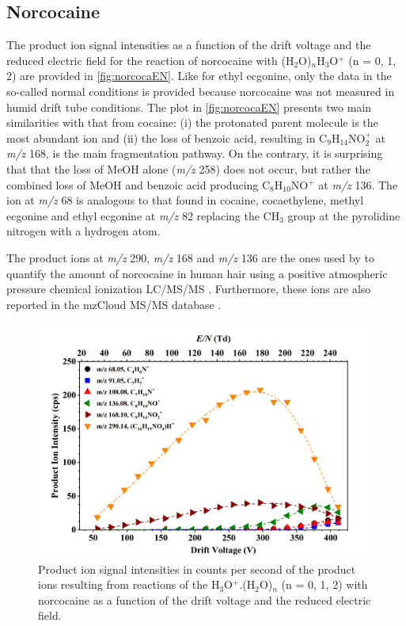 \subsection{Norcocaine}
The product ion signal intensities as a function of the drift voltage and the reduced electric field for the reaction of norcocaine with (H$_2$O)$_n$H$_3$O$^+$ (n = 0, 1, 2) are provided in \autoref{fig:norcocaEN}.
%
Like for ethyl ecgonine, only the data in the so-called normal conditions is provided because norcocaine was not measured in humid drift tube conditions. 
%
%
%
The plot in \autoref{fig:norcocaEN} presents two main similarities with that from cocaine:
(i) the protonated parent molecule is the most abundant ion and
(ii) the loss of benzoic acid, resulting in C$_{9}$H$_{14}$NO$_2^+$ at \textit{m/z} 168, is the main fragmentation pathway.
%
On the contrary, it is surprising that that the loss of MeOH alone (\textit{m/z} 258)  does not occur, but rather the combined loss of MeOH and benzoic acid producing C$_{8}$H$_{10}$NO$^+$ at \textit{m/z} 136.
%
The ion at \textit{m/z} 68 is analogous to that found in cocaine, cocaethylene, methyl ecgonine and ethyl ecgonine at \textit{m/z} 82 replacing the CH$_3$ group at the pyrolidine nitrogen with a hydrogen atom.

The product ions at \textit{m/z} 290, \textit{m/z} 168 and \textit{m/z} 136 are the ones used by \citeauthor{moore2007determination} to quantify the amount of norcocaine in human hair using a positive atmospheric pressure chemical ionization LC/MS/MS \cite{moore2007determination}.
Furthermore, these ions are also reported in the mzCloud MS/MS database \cite{mzcloud22}.







\begin{figure}[htbp]
\centering
\includegraphics[width=0.8\linewidth]{pics/cocaine-chapter/norcocaine-cps.png}
\caption{Product ion signal intensities in counts per second of the product ions resulting from reactions of the H$_3$O$^+$.(H$_2$O)$_n$ (n = 0, 1, 2) with norcocaine as a function of the drift voltage and the reduced electric field.} 
\label{fig:norcocaEN}
\end{figure}


